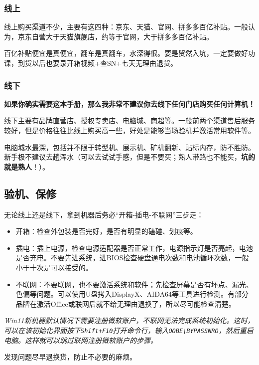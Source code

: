 \documentclass[../main.tex]{subfiles}
\begin{document}
\subsubsection{线上}

线上购买渠道不少，主要有这四种：京东、天猫、官网、拼多多百亿补贴。一般认为，京东自营大于天猫旗舰店，约等于官网，大于拼多多百亿补贴。

百亿补贴便宜是真便宜，翻车是真翻车，水深得很。要是贸然入坑，一定要做好功课，到货以后也要录开箱视频+查SN+七天无理由退货。

\subsubsection{线下}

\textbf{如果你确实需要这本手册，那么我非常不建议你去线下任何门店购买任何计算机！}

线下主要有品牌直营店、授权专卖店、电脑城、商超等。一般前两个渠道售后服务较好，但是价格往往比线上购买高一些，好处是能够当场验机并激活常用软件等。

电脑城水最深，包括并不限于转型机、展示机、矿机翻新、贴标内存，防不胜防。新手极不建议去趟浑水（可以去试试手感，但是不要买；熟人带路也不能买，\textbf{坑的就是熟人}！）。

\subsection{验机、保修}

无论线上还是线下，拿到机器后务必“开箱-插电-不联网”三步走：
\begin{itemize}
  \item 开箱：检查外包装是否完好，是否有明显的磕碰、划痕等。
  \item 插电：插上电源，检查电源适配器是否正常工作，电源指示灯是否亮起，电池是否充电。不要先进系统，进BIOS检查硬盘通电次数和电池循环次数，一般小于十次是可以接受的。
  \item 不联网：不要联网，也不要激活系统和软件；先检查屏幕是否有坏点、漏光、色偏等问题。可以使用U盘拷入DisplayX、AIDA64等工具进行检测。有部分品牌在激活Office或联网后就不给无理由退换了，所以尽可能检查清楚。
\end{itemize}

\textit{Win11新机器默认情况下需要注册微软账户，不联网无法完成系统初始化。这时，可以在该初始化界面按下\texttt{Shift+F10}打开命令行，输入\texttt{OOBE\textbackslash BYPASSNRO}，然后重启电脑。这样就可以跳过联网注册微软账户的步骤。}

发现问题尽早退换货，防止不必要的麻烦。
\end{document}
